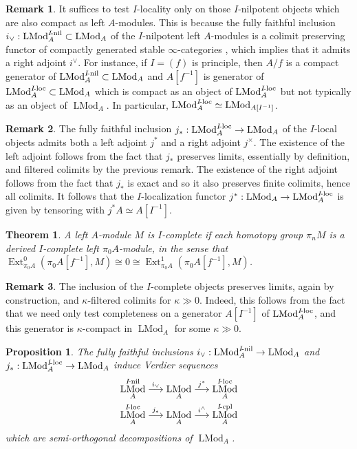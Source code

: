 \documentclass[12pt]{article}
\newtheorem{theorem}{Theorem}[subsection]
\newtheorem{proposition}{Proposition}[subsection]
\theoremstyle{definition}
\newtheorem{remark}{Remark}[subsection]
\renewcommand{\i}{\infty}
\newcommand{\too}{\longrightarrow}
\DeclareMathOperator{\LMod}{LMod}
\DeclareMathOperator{\Ext}{Ext}
\DeclareMathOperator{\loc}{loc}
\DeclareMathOperator{\nil}{nil}
\begin{document}
\begin{remark}
It suffices to test $I$-locality only on those $I$-nilpotent objects which are also compact as left $A$-modules.
This is because the fully faithful inclusion $i_\lor:\LMod_A^{I\textrm{\!-\!}\nil}\subset\LMod_A$ of the $I$-nilpotent left $A$-modules is a colimit preserving functor of compactly generated stable $\i$-categories \cite[Proposition 7.1.1.12]{SAG}, which implies that it admits a right adjoint $i^\lor$.
For instance, if $I=(f)$ is principle, then $A/f$ is a compact generator of $\LMod_A^{I\textrm{\!-\!}\nil}\subset\LMod_A$ and $A[f^{-1}]$ is generator of $\LMod_A^{I\textrm{\!-\!}\loc}\subset\LMod_A$ which is compact as an object of $\LMod_A^{I\textrm{\!-\!}\loc}$ but not typically as an object of $\LMod_A$.
In particular, $\LMod_A^{I\textrm{\!-\!}\loc}\simeq\LMod_{A[I^{-1}]}$.
\end{remark}
\begin{remark}
The fully faithful inclusion  $j_*:\LMod_A^{I\textrm{\!-\!}\loc}\to\LMod_A$  of the $I$-local objects admits both a left adjoint $j^*$ and a right adjoint $j^\times$.
The existence of the left adjoint follows from the fact that $j_*$ preserves limits, essentially by definition, and filtered colimits by the previous remark.
The existence of the right adjoint follows from the fact that $j_*$ is exact and so it also preserves finite colimits, hence all colimits.
It follows that the $I$-localization functor $j^*:\LMod_A\to\LMod_A^{I\textrm{\!-\!}\loc}$ is given by tensoring with $j^*A\simeq A[I^{-1}]$.
\end{remark}
\begin{theorem}{\em \cite[Theorem 7.3.4.1]{SAG}}
A left $A$-module $M$ is $I$-complete if each homotopy group $\pi_n M$ is a derived $I$-complete left $\pi_0 A$-module, in the sense that $\Ext^0_{\pi_0 A}(\pi_0 A[f^{-1}],M)\cong 0\cong\Ext^1_{\pi_0 A}(\pi_0 A[f^{-1}],M)$.
\end{theorem}
\begin{remark}
The inclusion of the $I$-complete objects preserves limits, again by construction, and $\kappa$-filtered colimits for $\kappa\gg 0$.
Indeed, this follows from the fact that we need only test completeness on a generator $A[I^{-1}]$ of $\LMod_A^{I\textrm{\!-\!}\loc}$, and this generator is $\kappa$-compact in $\LMod_A$ for some $\kappa\gg 0$.
\end{remark}
\begin{proposition}{\em \cite[Proposition 7.2.4.4 and Proposition 7.3.1.4]{SAG}}
The fully faithful inclusions $i_\lor:\LMod_A^{I\textrm{\!-\!}\nil}\to\LMod_A$ and $j_*:\LMod_A^{I\textrm{\!-\!}\loc}\to\LMod_A$ induce Verdier sequences
\begin{gather*}
\LMod_A^{I\textrm{\!-\!}\nil}\overset{i_\lor}{\too}\LMod_A\overset{j^*}{\too}\LMod_A^{I\textrm{\!-\!}\loc}\\
\LMod_A^{I\textrm{\!-\!}\loc}\overset{j_*}{\too}\LMod_A\overset{i^\land}{\too}\LMod_A^{I\textrm{\!-}\mathrm{cpl}}
\end{gather*}
which are semi-orthogonal decompositions of $\LMod_A$.
\end{proposition}
\end{document}
